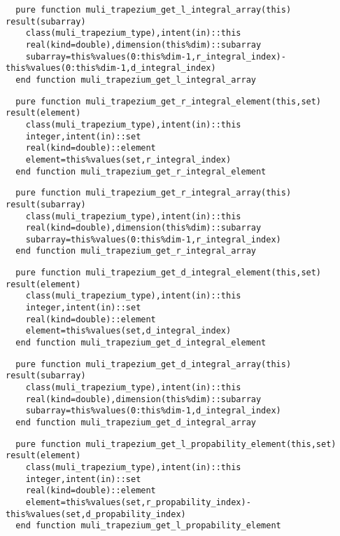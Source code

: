 \begin{Verbatim}
  pure function muli_trapezium_get_l_integral_array(this) result(subarray)
    class(muli_trapezium_type),intent(in)::this
    real(kind=double),dimension(this%dim)::subarray
    subarray=this%values(0:this%dim-1,r_integral_index)-this%values(0:this%dim-1,d_integral_index)
  end function muli_trapezium_get_l_integral_array
\end{Verbatim}

\begin{Verbatim}
  pure function muli_trapezium_get_r_integral_element(this,set) result(element)
    class(muli_trapezium_type),intent(in)::this
    integer,intent(in)::set
    real(kind=double)::element
    element=this%values(set,r_integral_index)
  end function muli_trapezium_get_r_integral_element
\end{Verbatim}

\begin{Verbatim}
  pure function muli_trapezium_get_r_integral_array(this) result(subarray)
    class(muli_trapezium_type),intent(in)::this
    real(kind=double),dimension(this%dim)::subarray
    subarray=this%values(0:this%dim-1,r_integral_index)
  end function muli_trapezium_get_r_integral_array
\end{Verbatim}

\begin{Verbatim}
  pure function muli_trapezium_get_d_integral_element(this,set) result(element)
    class(muli_trapezium_type),intent(in)::this
    integer,intent(in)::set
    real(kind=double)::element
    element=this%values(set,d_integral_index)
  end function muli_trapezium_get_d_integral_element
\end{Verbatim}

\begin{Verbatim}
  pure function muli_trapezium_get_d_integral_array(this) result(subarray)
    class(muli_trapezium_type),intent(in)::this
    real(kind=double),dimension(this%dim)::subarray
    subarray=this%values(0:this%dim-1,d_integral_index)
  end function muli_trapezium_get_d_integral_array
\end{Verbatim}

\begin{Verbatim}
  pure function muli_trapezium_get_l_propability_element(this,set) result(element)
    class(muli_trapezium_type),intent(in)::this
    integer,intent(in)::set
    real(kind=double)::element
    element=this%values(set,r_propability_index)-this%values(set,d_propability_index)
  end function muli_trapezium_get_l_propability_element
\end{Verbatim}

